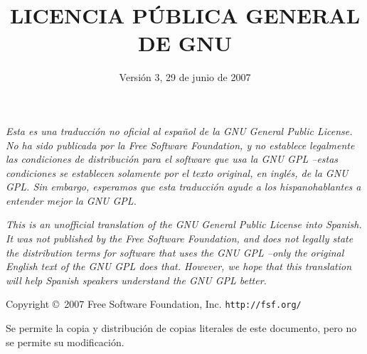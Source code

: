 \documentclass[11pt]{article}
\title{LICENCIA P\'{U}BLICA GENERAL DE GNU}
\date{Versi\'{o}n 3, 29 de junio de 2007}
\begin{document}
\maketitle

\textit{Esta es una traducci\'{o}n no oficial al espa\~nol de la GNU General Public License. No ha sido publicada por la Free Software Foundation, y no establece legalmente las condiciones de distribuci\'{o}n para el software que usa la GNU GPL --estas condiciones se establecen solamente por el texto original, en ingl\'{e}s, de la GNU GPL. Sin embargo, esperamos que esta traducci\'{o}n ayude a los hispanohablantes a entender mejor la GNU GPL. }

\vspace{0.4cm}

\textit{This is an unofficial translation of the GNU General Public License 
into Spanish. It was not published by the Free Software Foundation, and 
does not legally state the distribution terms for software that uses the 
GNU GPL --only the original English text of the GNU GPL does that. However, 
we hope that this translation will help Spanish speakers understand the 
GNU GPL better.}

\begin{center}
{\parindent 0in

Copyright \copyright\  2007 Free Software Foundation, Inc. \texttt{http://fsf.org/}
  
 
\bigskip
Se permite la copia y distribuci\'{o}n de copias literales de este documento, pero no se permite su modificaci\'{o}n. }

\end{center}
\end{document}
